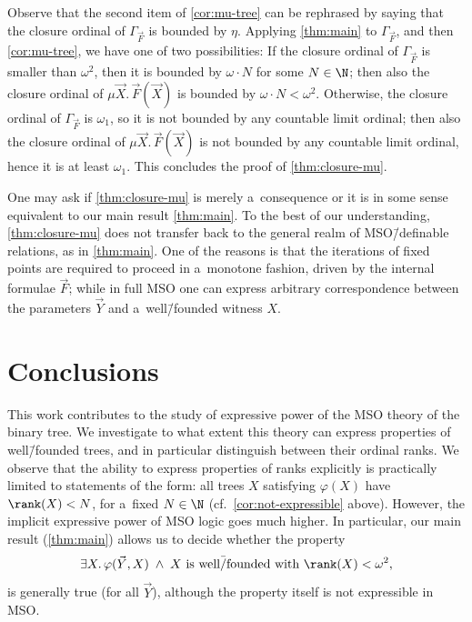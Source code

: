 \documentclass{lmcs}
\numberwithin{equation}{section}
\numberwithin{figure}{section}
\begin{document}
Observe that the second item of \cref{cor:mu-tree} can be rephrased by saying that the closure ordinal of $\Gamma_{\!\!\vec{F}}$ is bounded by $\eta$.
Applying \cref{thm:main} to $\Gamma_{\!\!\vec{F}}$, and then \cref{cor:mu-tree}, we have one of two possibilities:
If the closure ordinal of $\Gamma_{\!\!\vec{F}}$ is smaller than $\omega^2$, then it is bounded by $\omega\cdot N$ for some $N\in\N$;
then also the closure ordinal of $\mu\vec{X}.\,\vec{F}(\vec{X})$ is bounded by $\omega\cdot N<\omega^2$.
Otherwise, the closure ordinal of $\Gamma_{\!\!\vec{F}}$ is $\omega_1$, so it is not bounded by any countable limit ordinal;
then also the closure ordinal of $\mu\vec{X}.\,\vec{F}(\vec{X})$ is not bounded by any countable limit ordinal, hence it is at least $\omega_1$.
This concludes the proof of \cref{thm:closure-mu}.

\begin{rem}
	One may ask if \cref{thm:closure-mu} is merely a~consequence or it is in some sense equivalent to our main result \cref{thm:main}.
	To the best of our understanding, \cref{thm:closure-mu} does not transfer back to the general realm of MSO\=/definable relations, as in \cref{thm:main}.
	One of the reasons is that the iterations of fixed points are required to proceed in a~monotone fashion, driven by the internal formulae $\vec{F}$;
	while in full MSO one can express arbitrary correspondence between the parameters $\vec{Y}$ and a~well\=/founded witness $X$.
\end{rem}



\section{Conclusions}
\label{sec:conclusions}

This work contributes to the study of expressive power of the MSO theory of the binary tree.
We investigate to what extent this theory can express properties of well\=/founded trees, and in particular distinguish between their ordinal ranks.
We observe that the ability to express properties of ranks explicitly is practically limited to statements of the form:
all trees $X$ satisfying $\varphi (X)$ have $\rank (X) < N$, for a~fixed $N \in \N$ (cf.\ \cref{cor:not-expressible} above).
However, the implicit expressive power of MSO logic goes much higher.
In particular, our main result (\cref{thm:main}) allows us to decide whether the property
\[
  \exists X. \, \varphi (\vec{Y}, X) \; \wedge \;
  X \mbox{ is well\=/founded with } \rank (X) < \omega^2,
\]
is generally true (for all $\vec{Y}$), although the property itself is not expressible in MSO.
\end{document}

